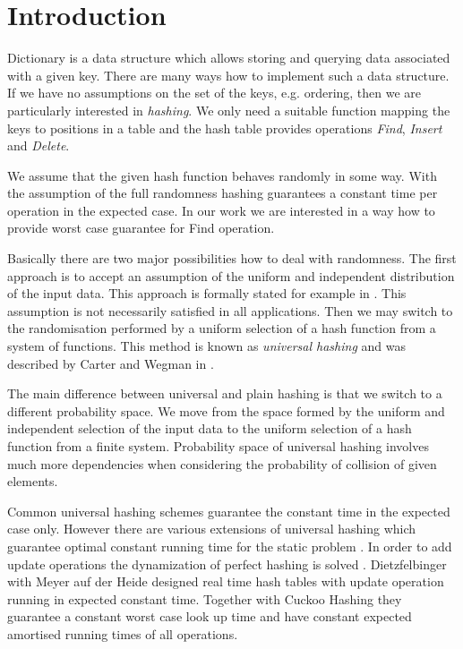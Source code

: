 \section{Introduction}
Dictionary is a data structure which allows storing and querying data associated with a given key. There are many ways how to implement such a data structure. If we have no assumptions on the set of the keys, e.g. ordering, then we are particularly interested in \emph{hashing}. We only need a suitable function mapping the keys to positions in a table and the hash table provides operations \emph{Find}, \emph{Insert} and \emph{Delete}. 

We assume that the given hash function behaves randomly in some way. With the assumption of the full randomness hashing guarantees a constant time per operation in the expected case. In our work we are interested in a way how to provide worst case guarantee for Find operation.

Basically there are two major possibilities how to deal with randomness. The first approach is to accept an assumption of the uniform and independent distribution of the input data. This approach is formally stated for example in \cite{DBLP:books/sp/Mehlhorn84}. This assumption is not necessarily satisfied in all applications. Then we may switch to the randomisation performed by a uniform selection of a hash function from a system of functions. This method is known as \emph{universal hashing} and was described by Carter and Wegman in \cite{DBLP:journals/jcss/CarterW79}. 

The main difference between universal and plain hashing is that we switch to a different probability space. We move from the space formed by the uniform and independent selection of the input data to the uniform selection of a hash function from a finite system. Probability space of universal hashing involves much more dependencies when considering the probability of collision of given elements.

Common universal hashing schemes guarantee the constant time in the expected case only. However there are various extensions of universal hashing which guarantee optimal constant running time for the static problem \cite{Fredman:1984:SST:828.1884}. In order to add update operations the dynamization of perfect hashing is solved \cite{DBLP:journals/siamcomp/DietzfelbingerKMHRT94}. Dietzfelbinger with Meyer auf der Heide designed real time hash tables \cite{DBLP:conf/icalp/DietzfelbingerH90} with update operation running in expected constant time. Together with Cuckoo Hashing \cite{DBLP:conf/esa/PaghR01} they guarantee a constant worst case look up time and have constant expected amortised running times of all operations.

